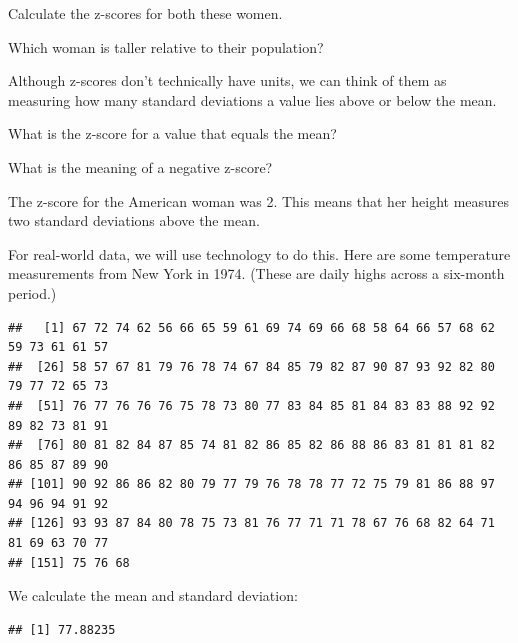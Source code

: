 \documentclass[
]{book}
\newenvironment{Shaded}{\begin{snugshade}}{\end{snugshade}}
\newcommand{\FunctionTok}[1]{\textcolor[rgb]{0.00,0.00,0.00}{#1}}
\newcommand{\NormalTok}[1]{#1}
\newcommand{\SpecialCharTok}[1]{\textcolor[rgb]{0.00,0.00,0.00}{#1}}
\begin{document}
Calculate the z-scores for both these women.

Which woman is taller relative to their population?

Although z-scores don't technically have units, we can think of them as measuring how many standard deviations a value lies above or below the mean.

What is the z-score for a value that equals the mean?

What is the meaning of a negative z-score?

The z-score for the American woman was 2. This means that her height measures two standard deviations above the mean.

For real-world data, we will use technology to do this. Here are some temperature measurements from New York in 1974. (These are daily highs across a six-month period.)

\begin{Shaded}
\end{Shaded}

\begin{verbatim}
##   [1] 67 72 74 62 56 66 65 59 61 69 74 69 66 68 58 64 66 57 68 62 59 73 61 61 57
##  [26] 58 57 67 81 79 76 78 74 67 84 85 79 82 87 90 87 93 92 82 80 79 77 72 65 73
##  [51] 76 77 76 76 76 75 78 73 80 77 83 84 85 81 84 83 83 88 92 92 89 82 73 81 91
##  [76] 80 81 82 84 87 85 74 81 82 86 85 82 86 88 86 83 81 81 81 82 86 85 87 89 90
## [101] 90 92 86 86 82 80 79 77 79 76 78 78 77 72 75 79 81 86 88 97 94 96 94 91 92
## [126] 93 93 87 84 80 78 75 73 81 76 77 71 71 78 67 76 68 82 64 71 81 69 63 70 77
## [151] 75 76 68
\end{verbatim}

We calculate the mean and standard deviation:

\begin{Shaded}
\end{Shaded}

\begin{verbatim}
## [1] 77.88235
\end{verbatim}

\begin{Shaded}
\end{Shaded}
\end{document}
